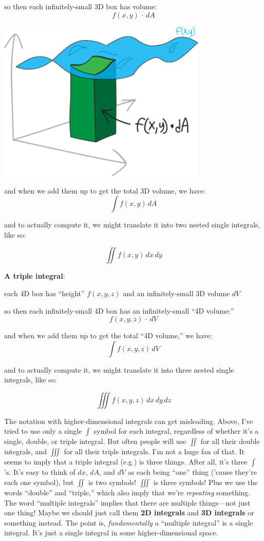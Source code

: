 \documentclass[
]{article}
\begin{document}
so then each infinitely-small 3D box has volume: \[f(x,y)\,\cdot\, dA\]

\includegraphics[width=0.75\textwidth,height=\textheight]{3d-integral-1-2.svg}

and when we add them up to get the total 3D volume, we have: \[\int f(x,y)\,dA\]

and to actually compute it, we might translate it into two nested single integrals, like so:

\[\iint f(x,y) \, dx\, dy\]

\textbf{A triple integral}:

each 4D box has ``height'' \(f(x,y,z)\) and an infinitely-small 3D volume \(dV\)

so then each infinitely-small 4D box has an infinitely-small ``4D volume:'' \[f(x,y,z)\,\cdot \, dV\]

and when we add them up to get the total ``4D volume,'' we have: \[\int f(x,y,z)\,dV\]

and to actually compute it, we might translate it into three nested single integrals, like so:

\[\iiint f(x,y,z)\, dx\, dy\, dz\]

The notation with higher-dimensional integrals can get misleading. Above, I've tried to use only a single \(\int\) symbol for each integral, regardless of whether it's a single, double, or triple integral. But often people will use \(\iint\) for all their double integrals, and \(\iiint\) for all their triple integrals. I'm not a huge fan of that. It seems to imply that a triple integral (e.g.) is three things. After all, it's three \(\int\)'s. It's easy to think of \(dx\), \(dA\), and \(dV\) as each being ``one'' thing ('cause they're each one symbol), but \(\iint\) is two symbols! \(\iiint\) is three symbols! Plus we use the words ``double'' and ``triple,'' which also imply that we're \emph{repeating} something. The word ``multiple integrals'' implies that there are multiple things---not just one thing! Maybe we should just call them \textbf{2D integrals} and \textbf{3D integrals} or something instead. The point is, \emph{fundamentally} a ``multiple integral'' is a single integral. It's just a single integral in some higher-dimensional space.
\end{document}
